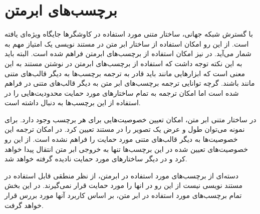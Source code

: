%
% 
% 
% 
%

\section{برچسب‌های ابرمتن}
با گسترش شبکه جهانی، ساختار متنی مورد استفاده در کاوشگرها جایگاه ویژه‌ای یافته است. از این رو امکان
استفاده از ساختار ابر متن در مستند نویسی یک امتیاز مهم به شمار می‌آید. در  نیز امکان استفاده از برچسب‌های 
ابرمتن فراهم شده است. البته باید به این نکته توجه داشت که استفاده از برچسب‌های ابرمتن در نوشتن مستند به این معنی است که 
ابزارهایی مانند  باید قادر به ترجمه برچسب‌ها به دیگر قالب‌های متنی مانند  باشند. گرچه توانایی ترجمه
برچسب‌های ابر متن به دیگر قالب‌های متنی در  فراهم شده است اما  امکان ترجمه به تمام ساختارهای مورد حمایت محدودیت‌هایی
را در استفاده از این برچسب‌ها به دنبال داشته است.

در ساختار متنی ابر متن، امکان تعیین خصوصیت‌هایی برای هر برچسب وجود دارد. برای نمونه می‌توان  طول و عرض یک تصویر را در مستند 
تعیین کرد. در  امکان ترجمه این خصوصیت‌ها به دیگر قالب‌های متنی مورد حمایت را فراهم نشده است. از این رو خصوصیت‌های 
تعیین شده در این برچسب‌ها تنها به خروجی ابر متن انتقال پیدا خواهد کرد و در دیگر ساختارهای مورد حمایت نادیده گرفته خواهد شد.

دسته‌ای از برچسب‌های مورد استفاده در ابرمتن، از نظر منطقی قابل استفاده در مستند نویسی نیست از این رو در  انها را مورد 
حمایت قرار نمی‌گیرند. در این بخش تمام برچسب‌های مورد استفاده در ابر متن، بر اساس کاربرد‌ آنها مورد بررس قرار خواهد گرفت.

